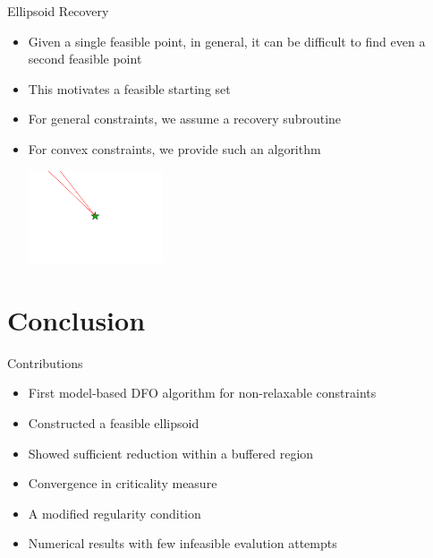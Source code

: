 \documentclass{beamer}
\begin{document}
\begin{frame}{Ellipsoid Recovery}
\begin{itemize}
	\item Given a single feasible point, in general, it can be difficult to find even a second feasible point
	\item This motivates a feasible starting set
	\item For general constraints, we assume a recovery subroutine
	\item For convex constraints, we provide such an algorithm
	\begin{center}
		\includegraphics[width=150px]{images/only_one_feasible_point.png}
	\end{center}
\end{itemize}
\end{frame}




\section{Conclusion}

\begin{frame}{Contributions}
	\begin{itemize}
		\setlength\itemsep{1.5em}
		\item First model-based DFO algorithm for non-relaxable constraints
		\item Constructed a feasible ellipsoid
		\item Showed sufficient reduction within a buffered region
		\item Convergence in criticality measure
		\item A modified regularity condition
		\item Numerical results with few infeasible evalution attempts
	\end{itemize}
\end{frame}
\end{document}
